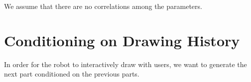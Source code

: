We assume that there are no correlations among the parameters. 

\section{Conditioning on Drawing History}
In order for the robot to interactively draw with users, we want to generate the next part conditioned on the previous parts. 